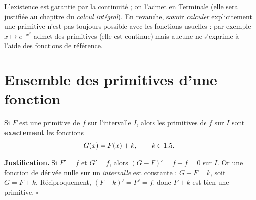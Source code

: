 \begin{remarque}
L'existence est garantie par la continuité ; on l'admet en Terminale (elle sera justifiée
au chapitre du \emph{calcul intégral}). En revanche, savoir \emph{calculer} explicitement une
primitive n'est pas toujours possible avec les fonctions usuelles : par exemple
$x\mapsto e^{-x^{2}}$ admet des primitives (elle est continue) mais aucune ne s'exprime
à l'aide des fonctions de référence.
\end{remarque}

\begin{illus}
\end{illus}

\section{Ensemble des primitives d'une fonction}

\begin{theoreme}
Si $F$ est une primitive de $f$ sur l'intervalle $I$, alors les primitives de $f$ sur $I$ sont
\textbf{exactement} les fonctions
\[
G(x)=F(x)+k,\qquad k\in1.5 .
\]
\end{theoreme}

\noindent\textbf{Justification.} Si $F'=f$ et $G'=f$, alors $(G-F)'=f-f=0$ sur $I$.
Or une fonction de dérivée nulle sur un \emph{intervalle} est constante : $G-F=k$, soit $G=F+k$.
Réciproquement, $(F+k)'=F'=f$, donc $F+k$ est bien une primitive. \hfill$\square$

